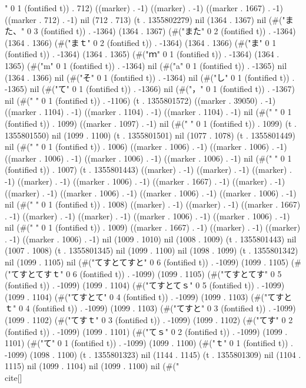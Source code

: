 " 0 1 (fontified t)) . 712) ((marker) . -1) ((marker) . -1) ((marker . 1667) . -1) ((marker . 712) . -1) nil (712 . 713) (t . 1355802279) nil (1364 . 1367) nil (#("また、" 0 3 (fontified t)) . -1364) (1364 . 1367) (#("また" 0 2 (fontified t)) . -1364) (1364 . 1366) (#("まｔ" 0 2 (fontified t)) . -1364) (1364 . 1366) (#("ま" 0 1 (fontified t)) . -1364) (1364 . 1365) (#("ｍ" 0 1 (fontified t)) . -1364) (1364 . 1365) (#("m" 0 1 (fontified t)) . -1364) nil (#("a" 0 1 (fontified t)) . -1365) nil (1364 . 1366) nil (#("そ" 0 1 (fontified t)) . -1364) nil (#("し" 0 1 (fontified t)) . -1365) nil (#("て" 0 1 (fontified t)) . -1366) nil (#("，" 0 1 (fontified t)) . -1367) nil (#("
" 0 1 (fontified t)) . -1106) (t . 1355801572) ((marker . 39050) . -1) ((marker . 1104) . -1) ((marker . 1104) . -1) ((marker . 1104) . -1) nil (#("
" 0 1 (fontified t)) . 1099) ((marker . 1097) . -1) nil (#("
" 0 1 (fontified t)) . 1099) (t . 1355801550) nil (1099 . 1100) (t . 1355801501) nil (1077 . 1078) (t . 1355801449) nil (#("
" 0 1 (fontified t)) . 1006) ((marker . 1006) . -1) ((marker . 1006) . -1) ((marker . 1006) . -1) ((marker . 1006) . -1) ((marker . 1006) . -1) nil (#("
" 0 1 (fontified t)) . 1007) (t . 1355801443) ((marker) . -1) ((marker) . -1) ((marker) . -1) ((marker) . -1) ((marker . 1006) . -1) ((marker . 1667) . -1) ((marker) . -1) ((marker) . -1) ((marker . 1006) . -1) ((marker . 1006) . -1) ((marker . 1006) . -1) nil (#("
" 0 1 (fontified t)) . 1008) ((marker) . -1) ((marker) . -1) ((marker . 1667) . -1) ((marker) . -1) ((marker) . -1) ((marker . 1006) . -1) ((marker . 1006) . -1) nil (#("
" 0 1 (fontified t)) . 1009) ((marker . 1667) . -1) ((marker) . -1) ((marker) . -1) ((marker . 1006) . -1) nil (1009 . 1010) nil (1008 . 1009) (t . 1355801443) nil (1007 . 1008) (t . 1355801345) nil (1099 . 1100) nil (1098 . 1099) (t . 1355801342) nil (1099 . 1105) nil (#("てすとてすと" 0 6 (fontified t)) . -1099) (1099 . 1105) (#("てすとてすｔ" 0 6 (fontified t)) . -1099) (1099 . 1105) (#("てすとてす" 0 5 (fontified t)) . -1099) (1099 . 1104) (#("てすとてｓ" 0 5 (fontified t)) . -1099) (1099 . 1104) (#("てすとて" 0 4 (fontified t)) . -1099) (1099 . 1103) (#("てすとｔ" 0 4 (fontified t)) . -1099) (1099 . 1103) (#("てすと" 0 3 (fontified t)) . -1099) (1099 . 1102) (#("てすｔ" 0 3 (fontified t)) . -1099) (1099 . 1102) (#("てす" 0 2 (fontified t)) . -1099) (1099 . 1101) (#("てｓ" 0 2 (fontified t)) . -1099) (1099 . 1101) (#("て" 0 1 (fontified t)) . -1099) (1099 . 1100) (#("ｔ" 0 1 (fontified t)) . -1099) (1098 . 1100) (t . 1355801323) nil (1144 . 1145) (t . 1355801309) nil (1104 . 1115) nil (1099 . 1104) nil (1099 . 1100) nil (#("\\cite[]
